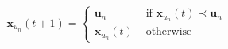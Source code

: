 \begin{equation}
\mathbf{x}_{u_{n}}(t+1)=\left\{\begin{array}{ll}{\mathbf{u}_{n}} & {\text { if } \mathbf{x}_{u_{n}}(t) \prec \mathbf{u}_{n}} \\ {\mathbf{x}_{u_{n}}(t)} & {\text { otherwise }}\end{array}\right.
\label{fCDE-equation}
\end{equation}